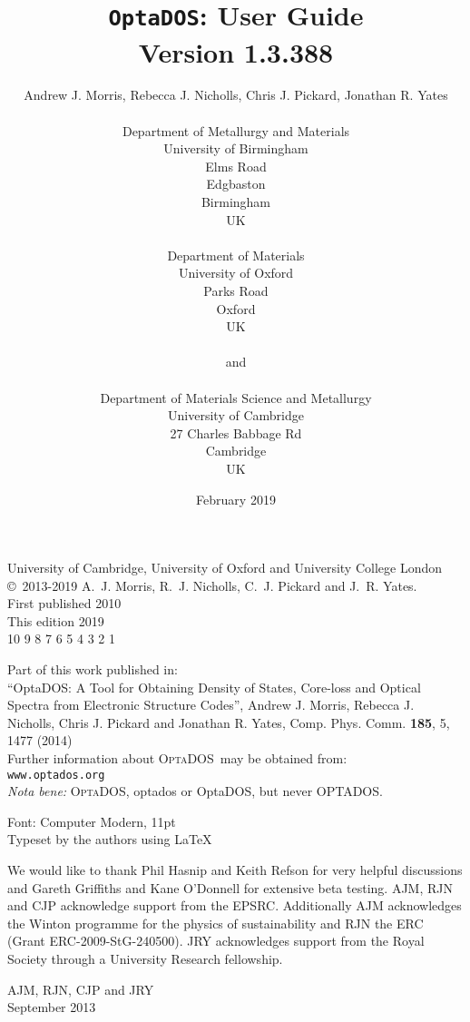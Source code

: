 \documentclass[a4paper,11pt,twoside]{book}
\title{{\huge {\tt OptaDOS}: User Guide}\\ {Version 1.3.388}}
\author{Andrew J. Morris, Rebecca J. Nicholls, Chris J. Pickard, Jonathan R. Yates \\
\\
Department of Metallurgy and Materials\\
University of Birmingham \\
Elms Road\\
Edgbaston\\
Birmingham\\
UK\\
\\
Department of Materials\\
University of Oxford\\
Parks Road\\
Oxford\\
UK \\
\\
{\small and} \\
\\
Department of Materials Science and Metallurgy\\
University of Cambridge\\
27 Charles Babbage Rd\\
Cambridge\\
UK\\
}
\date{February 2019}
\begin{document}
\newcommand{\optados}{\textsc{OptaDOS}}
\newcommand{\lindos}{\texttt{LinDOS}}
\newcommand{\onetep}{\textsc{onetep}}
\newcommand{\castep}{\textsc{castep}}
\maketitle

 \thispagestyle{empty}

\begin{centering}
\vspace*{40mm}
University of Cambridge, University of Oxford and University College London\\
\vspace{5mm}
\copyright\ 2013-2019 A.~J. Morris, R.~J. Nicholls, C.~J. Pickard and J.~R. Yates.\\
\vspace{5mm}
First published 2010\\
This edition 2019\\
\vspace{5mm}
10 9 8 7 6 5 4 3 2 1
\vspace{5mm}

Part of this work published in:\\
``OptaDOS: A Tool for Obtaining Density of States, Core-loss and Optical Spectra from Electronic Structure Codes'', Andrew J. Morris, Rebecca J. Nicholls, Chris J. Pickard and Jonathan R. Yates, Comp. Phys. Comm. {\bf 185}, 5, 1477 (2014)\\
\vspace{10mm}
Further information about \optados\ may be obtained from:\\ \texttt{www.optados.org}\\

\vspace{10mm}
\emph{Nota bene:} \optados, optados or OptaDOS, but never OPTADOS.

\null\vfill
\noindent
Font: Computer Modern, 11pt\\
Typeset by the authors using \LaTeX\, \\
\end{centering}
\newpage

\setcounter{tocdepth}{1}
\tableofcontents

\newpage
 \thispagestyle{empty}
\vspace*{50mm}
\begin{centering}
We would like to thank Phil Hasnip and Keith Refson for very helpful discussions and Gareth Griffiths and Kane O'Donnell for extensive beta testing.
 AJM, RJN and CJP acknowledge support from the EPSRC. Additionally AJM acknowledges
the Winton programme for the physics of sustainability and RJN the ERC
(Grant ERC-2009-StG-240500).
 JRY acknowledges support from the Royal Society through a University Research fellowship.
\end{centering}
\begin{flushright}
AJM, RJN, CJP and JRY\\
September 2013
\end{flushright}
\end{document}
